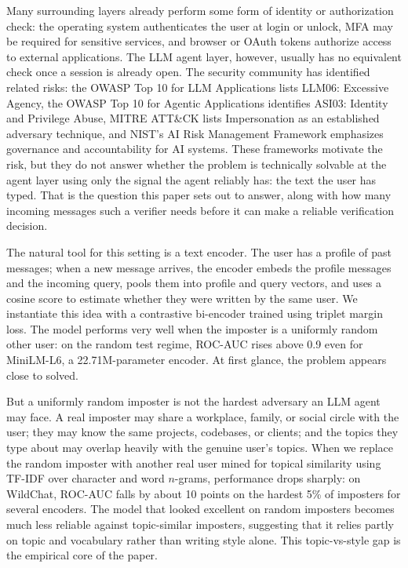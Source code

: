 \documentclass[11pt]{article}
\begin{document}
Many surrounding layers already perform some form of identity or authorization check: the operating system authenticates the user at login or unlock, MFA may be required for sensitive services, and browser or OAuth tokens authorize access to external applications. The LLM agent layer, however, usually has no equivalent check once a session is already open. The security community has identified related risks: the OWASP Top 10 for LLM Applications \citep{owasp2025llm} lists LLM06: Excessive Agency, the OWASP Top 10 for Agentic Applications \citep{owasp2026agentic} identifies ASI03: Identity and Privilege Abuse, MITRE ATT\&CK lists Impersonation \citep{mitre_t1656} as an established adversary technique, and NIST's AI Risk Management Framework \citep{nist2023airmf} emphasizes governance and accountability for AI systems. These frameworks motivate the risk, but they do not answer whether the problem is technically solvable at the agent layer using only the signal the agent reliably has: the text the user has typed. That is the question this paper sets out to answer, along with how many incoming messages such a verifier needs before it can make a reliable verification decision.

The natural tool for this setting is a text encoder. The user has a profile of past messages; when a new message arrives, the encoder embeds the profile messages and the incoming query, pools them into profile and query vectors, and uses a cosine score to estimate whether they were written by the same user. We instantiate this idea with a contrastive bi-encoder trained using triplet margin loss. The model performs very well when the imposter is a uniformly random other user: on the random test regime, ROC-AUC rises above 0.9 even for MiniLM-L6, a 22.71M-parameter encoder. At first glance, the problem appears close to solved.

But a uniformly random imposter is not the hardest adversary an LLM agent may face. A real imposter may share a workplace, family, or social circle with the user; they may know the same projects, codebases, or clients; and the topics they type about may overlap heavily with the genuine user's topics. When we replace the random imposter with another real user mined for topical similarity using TF-IDF over character and word $n$-grams, performance drops sharply: on WildChat, ROC-AUC falls by about 10 points on the hardest 5\% of imposters for several encoders. The model that looked excellent on random imposters becomes much less reliable against topic-similar imposters, suggesting that it relies partly on topic and vocabulary rather than writing style alone. This topic-vs-style gap is the empirical core of the paper.
\end{document}
